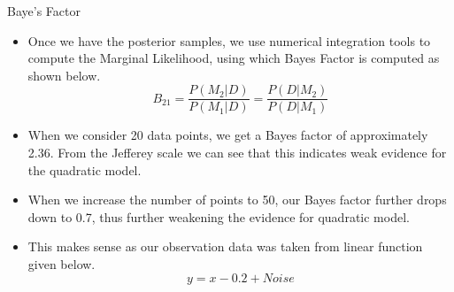 \documentclass[t, aspectratio=169]{beamer}
\begin{document}
\begin{frame}{Baye's Factor}
\begin{itemize}
    \item Once we have the posterior samples, we use numerical integration tools to compute the Marginal Likelihood, using which Bayes Factor is computed as shown below.
\[B_{21} = \frac{P(M_2|D)}{P(M_1|D)} = \frac{P(D|M_2)}{P(D|M_1)}\]
\item When we consider 20 data points, we get a Bayes factor of approximately 2.36. From the Jefferey scale we can see that this indicates weak evidence for the quadratic model.
\item When we increase the number of points to 50, our Bayes factor further drops down to 0.7, thus further weakening the evidence for quadratic model.
\item This makes sense as our observation data was taken from linear function given below.
\[y = x - 0.2 + Noise\]


\end{itemize}
 
\end{frame}


\end{document}
